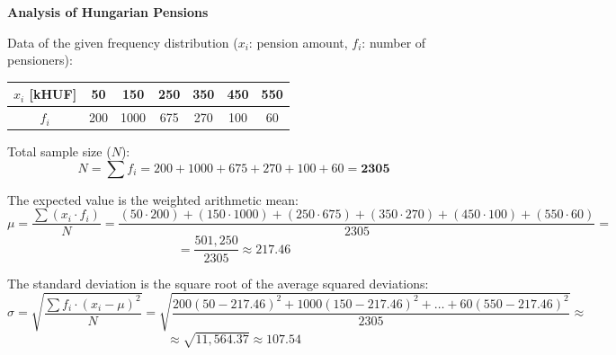 \documentclass[a4paper,12pt]{letter}
\begin{document}
\begin{center}
\textbf{\huge Analysis of Hungarian Pensions}
\end{center}

\vspace{10pt}

Data of the given frequency distribution ($x_i$: pension amount, $f_i$: number of pensioners):

\begin{center}
\begin{tabular}{|c|cccccc|}
\hline
$x_i$ [kHUF] & 50 & 150 & 250 & 350 & 450 & 550 \\ \hline
$f_i$ & 200 & 1000 & 675 & 270 & 100 & 60 \\ \hline
\end{tabular}
\end{center}

Total sample size ($N$): $$ N = \sum f_i = 200 + 1000 + 675 + 270 + 100 + 60 = \mathbf{2305}$$

The expected value is the weighted arithmetic mean: $$\mu = \frac{\sum (x_i \cdot f_i)}{N}= \frac{(50 \cdot 200) + (150 \cdot 1000) + (250 \cdot 675) + (350 \cdot 270) + (450 \cdot 100) + (550 \cdot 60)}{2305} =$$ $$ =\frac{501,250}{2305} \approx \mathbf{217.46}$$

The standard deviation is the square root of the average squared deviations: $$\sigma = \sqrt{\frac{\sum f_i \cdot (x_i - \mu)^2}{N}} = \sqrt{\frac{200(50-217.46)^2 + 1000(150-217.46)^2 + \dots + 60(550-217.46)^2}{2305}} \approx$$ $$ \approx \sqrt{11,564.37} \approx \mathbf{107.54}$$

\begin{center}
  \bigskip
{}
\end{center}
\end{document}
